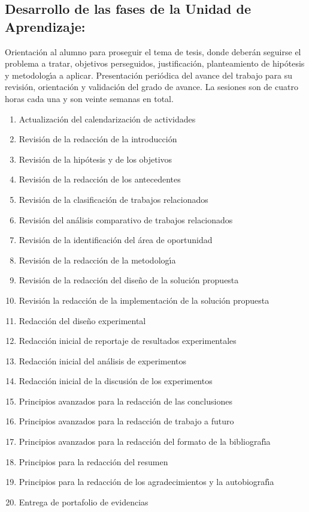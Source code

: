 \documentclass[10 pt]{article}
\begin{document}
\subsection{Desarrollo de las fases de la Unidad de Aprendizaje:}

Orientaci\'{o}n al alumno para proseguir el tema de tesis, donde deber\'{a}n
seguirse el problema a tratar, objetivos perseguidos, justificaci\'{o}n,
planteamiento de hip\'{o}tesis y metodolog\'{\i}a a aplicar.  Presentaci\'{o}n
peri\'{o}dica del avance del trabajo para su revisi\'{o}n, orientaci\'{o}n y
validaci\'{o}n del grado de avance. La sesiones son de cuatro horas cada
una y son veinte semanas en total.

\begin{enumerate}[itemsep=-2pt]
\item Actualizaci\'{o}n del calendarizaci\'{o}n de actividades
\item Revisi\'{o}n de la redacci\'{o}n de la introducci\'{o}n
\item Revisi\'{o}n de la hip\'{o}tesis y de los objetivos
\item Revisi\'{o}n de la redacci\'{o}n de los antecedentes
\item Revisi\'{o}n de la clasificaci\'{o}n de trabajos relacionados
\item Revisi\'{o}n del an\'{a}lisis comparativo de trabajos relacionados
\item Revisi\'{o}n de la identificaci\'{o}n del \'{a}rea de oportunidad
\item Revisi\'{o}n de la redacci\'{o}n de la metodolog\'{\i}a
\item Revisi\'{o}n de la redacci\'{o}n del dise\~{n}o de la soluci\'{o}n propuesta
\item Revisi\'{o}n la redacci\'{o}n de la implementaci\'{o}n de la soluci\'{o}n propuesta
\item Redacci\'{o}n del dise\~{n}o experimental
\item Redacci\'{o}n inicial de reportaje de resultados experimentales
\item Redacci\'{o}n inicial del an\'{a}lisis de experimentos
\item Redacci\'{o}n inicial de la discusi\'{o}n de los experimentos
\item Principios avanzados para la redacci\'{o}n de las conclusiones
\item Principios avanzados para la redacci\'{o}n de trabajo a futuro
\item Principios avanzados para la redacci\'{o}n del formato de la bibliograf\'{\i}a
\item Principios para la redacci\'{o}n del resumen
\item Principios para la redacci\'{o}n de los agradecimientos y la autobiograf\'{\i}a
\item Entrega de portafolio de evidencias
\end{enumerate}
\end{document}
